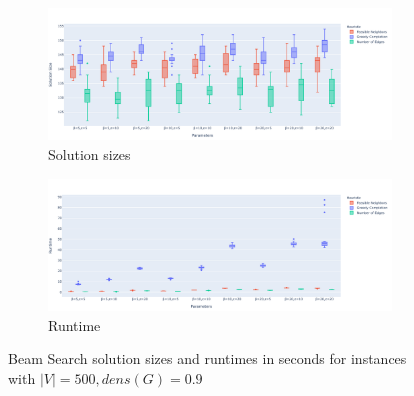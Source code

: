 \documentclass[draft,final]{vutinfth} %
\begin{document}
\begin{figure}
    \centering
    \begin{subfigure}{\textwidth}
        \centering
        \includegraphics[width=\textwidth]{graphics/lbh-09-500-size.pdf}
        \caption{Solution sizes}
    \end{subfigure}
    \begin{subfigure}{\textwidth}
        \centering
        \includegraphics[width=\textwidth]{graphics/lbh-09-500-runtime.pdf}
        \caption{Runtime}
    \end{subfigure}
    \caption{Beam Search solution sizes and runtimes in seconds for instances with $|V|=500, dens(G)=0.9$}
    \label{fig:bs-heuristics-random-2}
\end{figure}
\end{document}
